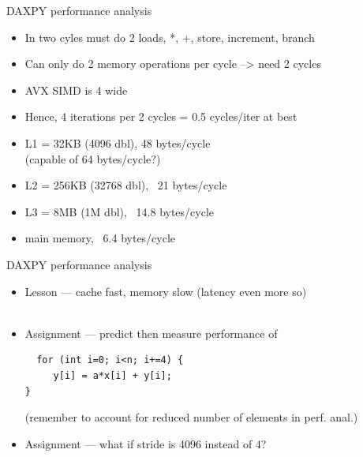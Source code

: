 \begin{frame}[fragile]{DAXPY performance analysis}
  \begin{itemize}
  \item In two cyles must do 2 loads, *, +, store, increment, branch
  \item Can only do 2 memory operations per cycle --> need 2 cycles
  \item AVX SIMD is 4 wide
  \item Hence, 4 iterations per 2 cycles = 0.5 cycles/iter at best
  \item L1 = 32KB (4096 dbl), 48 bytes/cycle \\
  (capable of 64 bytes/cycle?)
  \item L2 = 256KB (32768 dbl), ~21 bytes/cycle
  \item L3 = 8MB (1M dbl), ~14.8 bytes/cycle
  \item main memory, ~6.4 bytes/cycle
  \end{itemize}
  
\end{frame}

\begin{frame}[fragile]{DAXPY performance analysis}
  \begin{itemize}
  \item Lesson --- cache fast, memory slow (latency even more so)
  \\
  \ 
  \item Assignment --- predict then measure performance of
\begin{verbatim}
  for (int i=0; i<n; i+=4) {
     y[i] = a*x[i] + y[i];
}
\end{verbatim}
  (remember to account for reduced number of elements in perf. anal.)
  \item Assignment --- what if stride is 4096 instead of 4?
  \end{itemize}
  
\end{frame}

